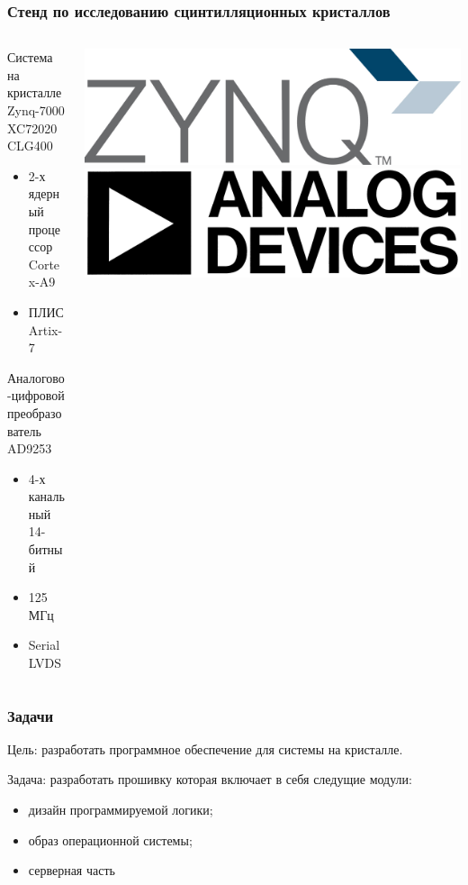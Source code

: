 \documentclass[aspectratio=169]{beamer}
\begin{document}
\begin{frame}
\frametitle{Стенд по исследованию сцинтилляционных кристаллов}
    \begin{columns}
        \begin{column}{0.7\textwidth}
        Система на кристалле Zynq-7000 XC72020 CLG400
            \begin{itemize}
                \item 2-х ядерный процессор Cortex-A9
                \item ПЛИС Artix-7
            \end{itemize}
        Аналогово-цифровой преобразователь AD9253
            \begin{itemize}
                \item 4-х канальный 14-битный
                \item 125 МГц
                \item Serial LVDS
            \end{itemize}
        \end{column}
        \begin{column}{0.3\textwidth}
            \includegraphics[width=\textwidth]{Zynq.jpg}
            \includegraphics[width=\textwidth]{Analog_devices.jpg}
        \end{column}
    \end{columns}
\end{frame}

\begin{frame}
\frametitle{Задачи}
    Цель: разработать программное обеспечение для системы на кристалле.\par
    Задача: разработать прошивку которая включает в себя следущие модули:
    \begin{itemize}
        \item дизайн программируемой логики; 
        \item образ операционной системы;
        \item серверная часть
    \end{itemize}
\end{frame}
\end{document}
